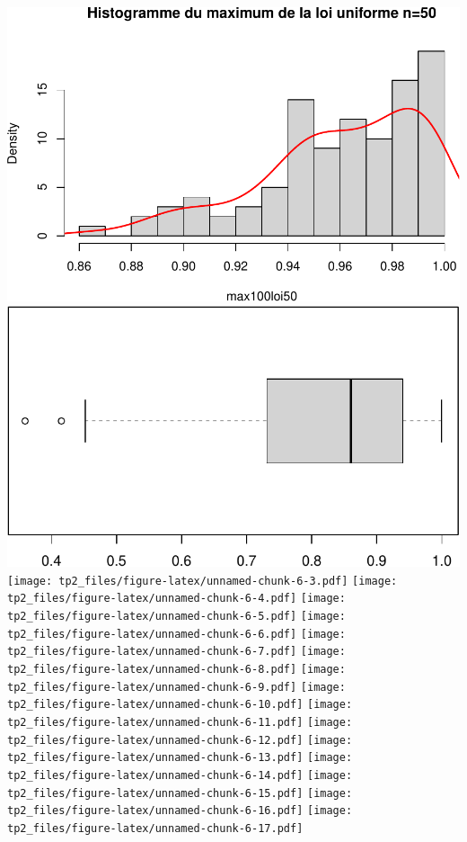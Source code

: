 \documentclass[
]{article}
\begin{document}
\includegraphics{tp2_files/figure-latex/unnamed-chunk-6-1.pdf}
\includegraphics{tp2_files/figure-latex/unnamed-chunk-6-2.pdf}
\texttt{[image: tp2\_files/figure-latex/unnamed-chunk-6-3.pdf]}
\texttt{[image: tp2\_files/figure-latex/unnamed-chunk-6-4.pdf]}
\texttt{[image: tp2\_files/figure-latex/unnamed-chunk-6-5.pdf]}
\texttt{[image: tp2\_files/figure-latex/unnamed-chunk-6-6.pdf]}
\texttt{[image: tp2\_files/figure-latex/unnamed-chunk-6-7.pdf]}
\texttt{[image: tp2\_files/figure-latex/unnamed-chunk-6-8.pdf]}
\texttt{[image: tp2\_files/figure-latex/unnamed-chunk-6-9.pdf]}
\texttt{[image: tp2\_files/figure-latex/unnamed-chunk-6-10.pdf]}
\texttt{[image: tp2\_files/figure-latex/unnamed-chunk-6-11.pdf]}
\texttt{[image: tp2\_files/figure-latex/unnamed-chunk-6-12.pdf]}
\texttt{[image: tp2\_files/figure-latex/unnamed-chunk-6-13.pdf]}
\texttt{[image: tp2\_files/figure-latex/unnamed-chunk-6-14.pdf]}
\texttt{[image: tp2\_files/figure-latex/unnamed-chunk-6-15.pdf]}
\texttt{[image: tp2\_files/figure-latex/unnamed-chunk-6-16.pdf]}
\texttt{[image: tp2\_files/figure-latex/unnamed-chunk-6-17.pdf]}
\end{document}
